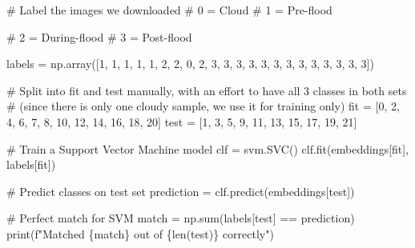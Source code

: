 \documentclass[
  letterpaper,
  DIV=11,
  numbers=noendperiod]{scrreprt}
\newenvironment{Shaded}{\begin{snugshade}}{\end{snugshade}}
\newcommand{\BuiltInTok}[1]{\textcolor[rgb]{0.00,0.23,0.31}{#1}}
\newcommand{\CommentTok}[1]{\textcolor[rgb]{0.37,0.37,0.37}{#1}}
\newcommand{\DecValTok}[1]{\textcolor[rgb]{0.68,0.00,0.00}{#1}}
\newcommand{\NormalTok}[1]{\textcolor[rgb]{0.00,0.23,0.31}{#1}}
\newcommand{\OperatorTok}[1]{\textcolor[rgb]{0.37,0.37,0.37}{#1}}
\newcommand{\SpecialCharTok}[1]{\textcolor[rgb]{0.37,0.37,0.37}{#1}}
\newcommand{\SpecialStringTok}[1]{\textcolor[rgb]{0.13,0.47,0.30}{#1}}
\begin{document}
\begin{Shaded}
\begin{Highlighting}[]
\CommentTok{\# Label the images we downloaded}
\CommentTok{\# 0 = Cloud}
\CommentTok{\# 1 = Pre{-}flood}

\CommentTok{\# 2 = During{-}flood}
\CommentTok{\# 3 = Post{-}flood}

\NormalTok{labels }\OperatorTok{=}\NormalTok{ np.array([}\DecValTok{1}\NormalTok{, }\DecValTok{1}\NormalTok{, }\DecValTok{1}\NormalTok{, }\DecValTok{1}\NormalTok{, }\DecValTok{1}\NormalTok{, }\DecValTok{2}\NormalTok{, }\DecValTok{2}\NormalTok{, }\DecValTok{0}\NormalTok{, }\DecValTok{2}\NormalTok{, }\DecValTok{3}\NormalTok{, }\DecValTok{3}\NormalTok{, }\DecValTok{3}\NormalTok{, }\DecValTok{3}\NormalTok{, }\DecValTok{3}\NormalTok{, }\DecValTok{3}\NormalTok{, }\DecValTok{3}\NormalTok{, }\DecValTok{3}\NormalTok{, }\DecValTok{3}\NormalTok{, }\DecValTok{3}\NormalTok{, }\DecValTok{3}\NormalTok{, }\DecValTok{3}\NormalTok{, }\DecValTok{3}\NormalTok{])}

\CommentTok{\# Split into fit and test manually, with an effort to have all 3 classes in both sets}
\CommentTok{\# (since there is only one cloudy sample, we use it for training only)}
\NormalTok{fit }\OperatorTok{=}\NormalTok{ [}\DecValTok{0}\NormalTok{, }\DecValTok{2}\NormalTok{, }\DecValTok{4}\NormalTok{, }\DecValTok{6}\NormalTok{, }\DecValTok{7}\NormalTok{, }\DecValTok{8}\NormalTok{, }\DecValTok{10}\NormalTok{, }\DecValTok{12}\NormalTok{, }\DecValTok{14}\NormalTok{, }\DecValTok{16}\NormalTok{, }\DecValTok{18}\NormalTok{, }\DecValTok{20}\NormalTok{]}
\NormalTok{test }\OperatorTok{=}\NormalTok{ [}\DecValTok{1}\NormalTok{, }\DecValTok{3}\NormalTok{, }\DecValTok{5}\NormalTok{, }\DecValTok{9}\NormalTok{, }\DecValTok{11}\NormalTok{, }\DecValTok{13}\NormalTok{, }\DecValTok{15}\NormalTok{, }\DecValTok{17}\NormalTok{, }\DecValTok{19}\NormalTok{, }\DecValTok{21}\NormalTok{]}

\CommentTok{\# Train a Support Vector Machine model}
\NormalTok{clf }\OperatorTok{=}\NormalTok{ svm.SVC()}
\NormalTok{clf.fit(embeddings[fit], labels[fit])}

\CommentTok{\# Predict classes on test set}
\NormalTok{prediction }\OperatorTok{=}\NormalTok{ clf.predict(embeddings[test])}

\CommentTok{\# Perfect match for SVM}
\NormalTok{match }\OperatorTok{=}\NormalTok{ np.}\BuiltInTok{sum}\NormalTok{(labels[test] }\OperatorTok{==}\NormalTok{ prediction)}
\BuiltInTok{print}\NormalTok{(}\SpecialStringTok{f"Matched }\SpecialCharTok{\{}\NormalTok{match}\SpecialCharTok{\}}\SpecialStringTok{ out of }\SpecialCharTok{\{}\BuiltInTok{len}\NormalTok{(test)}\SpecialCharTok{\}}\SpecialStringTok{ correctly"}\NormalTok{)}
\end{Highlighting}
\end{Shaded}
\end{document}
